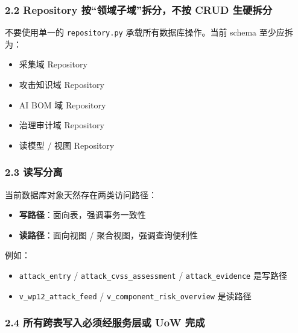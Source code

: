 \documentclass[UTF8]{ctexart}
\providecommand{\tightlist}{%
  \setlength{\itemsep}{0pt}\setlength{\parskip}{0pt}}
\begin{document}
\hypertarget{repository-ux6309ux9886ux57dfux5b50ux57dfux62c6ux5206ux4e0dux6309-crud-ux751fux786cux62c6ux5206}{%
\subsubsection{2.2 Repository 按``领域子域''拆分，不按 CRUD
生硬拆分}\label{repository-ux6309ux9886ux57dfux5b50ux57dfux62c6ux5206ux4e0dux6309-crud-ux751fux786cux62c6ux5206}}

不要使用单一的 \texttt{repository.py} 承载所有数据库操作。当前 schema
至少应拆为：

\begin{itemize}
\tightlist
\item
  采集域 Repository
\item
  攻击知识域 Repository
\item
  AI BOM 域 Repository
\item
  治理审计域 Repository
\item
  读模型 / 视图 Repository
\end{itemize}

\hypertarget{ux8bfbux5199ux5206ux79bb}{%
\subsubsection{2.3 读写分离}\label{ux8bfbux5199ux5206ux79bb}}

当前数据库对象天然存在两类访问路径：

\begin{itemize}
\tightlist
\item
  \textbf{写路径}：面向表，强调事务一致性
\item
  \textbf{读路径}：面向视图 / 聚合视图，强调查询便利性
\end{itemize}

例如：

\begin{itemize}
\tightlist
\item
  \texttt{attack\_entry} / \texttt{attack\_cvss\_assessment} /
  \texttt{attack\_evidence} 是写路径
\item
  \texttt{v\_wp12\_attack\_feed} / \texttt{v\_component\_risk\_overview}
  是读路径
\end{itemize}

\hypertarget{ux6240ux6709ux8de8ux8868ux5199ux5165ux5fc5ux987bux7ecfux670dux52a1ux5c42ux6216-uow-ux5b8cux6210}{%
\subsubsection{2.4 所有跨表写入必须经服务层或 UoW
完成}\label{ux6240ux6709ux8de8ux8868ux5199ux5165ux5fc5ux987bux7ecfux670dux52a1ux5c42ux6216-uow-ux5b8cux6210}}
\end{document}
